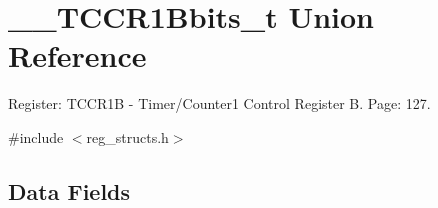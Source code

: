 \hypertarget{union_____t_c_c_r1_bbits__t}{\section{\+\_\+\+\_\+\+T\+C\+C\+R1\+Bbits\+\_\+t Union Reference}
\label{union_____t_c_c_r1_bbits__t}
}


Register\+: T\+C\+C\+R1\+B -\/ Timer/\+Counter1 Control Register B. Page\+: 127.  




{\ttfamily \#include $<$reg\+\_\+structs.\+h$>$}

\subsection*{Data Fields}
